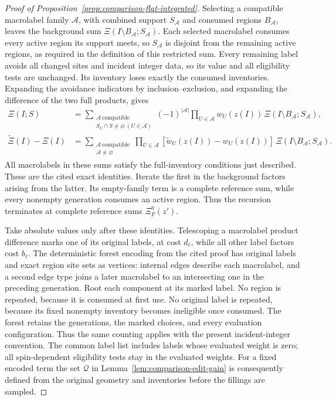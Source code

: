 \begin{proof}[Proof of Proposition~\ref{prop:comparison-flat-integrated}]
Selecting a compatible macrolabel family \(\mathcal A\), with combined
support \(S_{\mathcal A}\) and consumed regions \(B_{\mathcal A}\), leaves
the background sum
\(\Xi(I\setminus B_{\mathcal A};S_{\mathcal A})\).
Each selected macrolabel consumes every active region its support meets,
so \(S_{\mathcal A}\) is disjoint from the remaining active regions, as
required in the definition of this restricted sum.  Every remaining
label avoids all changed sites and incident integer data, so its value
and all eligibility tests are unchanged.  Its inventory loses exactly
the consumed inventories.  Expanding the avoidance indicators by
inclusion--exclusion, and expanding the difference of the two full
products, gives
\begin{align*}
 \Xi(I;S)
 &=\sum_{\substack{\mathcal A\ \mathrm{compatible}\\
                    S_U\cap S\ne\varnothing\ (U\in\mathcal A)}}
       (-1)^{|\mathcal A|}
       \prod_{U\in\mathcal A}w_U(z(I))\,
       \Xi(I\setminus B_{\mathcal A};S_{\mathcal A}),\\
 \widetilde\Xi(I)-\Xi(I)
 &=\sum_{\substack{\mathcal A\ \mathrm{compatible}\\
                    \mathcal A\ne\varnothing}}
       \prod_{U\in\mathcal A}
            [\widetilde w_U(z(I))-w_U(z(I))]\,
       \Xi(I\setminus B_{\mathcal A};S_{\mathcal A}).
\end{align*}
All macrolabels in these sums satisfy the full-inventory conditions just
described.  These are the cited exact identities.  Iterate the first in the
background factors arising from the latter.  Its empty-family term is a
complete reference sum, while every nonempty generation consumes an
active region.  Thus the recursion terminates at complete reference sums
\(\Xi_F^\eta(z')\).

Take absolute values only after these identities.  Telescoping a
macrolabel product difference marks one of its original labels, at cost
\(d_\ell\), while all other label factors cost \(b_\ell\).  The deterministic
forest encoding from the cited proof has original labels and exact
region site sets as vertices: internal edges describe each macrolabel,
and a second edge type joins a later macrolabel to an intersecting one
in the preceding generation.  Root each component at its marked label.
No region is repeated, because it is consumed at first use.  No original
label is repeated, because its fixed nonempty inventory becomes
ineligible once consumed.  The forest retains the generations, the
marked choices, and every evaluation configuration.  Thus the same
counting applies with the present incident-integer convention.
The common label list includes labels whose evaluated weight is zero;
all spin-dependent eligibility tests stay in the evaluated weights.
For a fixed encoded term the set \(\mathcal Q\) in
Lemma~\ref{lem:comparison-edit-gain} is consequently defined from the
original geometry and inventories before the fillings are sampled.


\end{proof}
